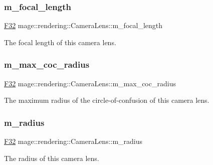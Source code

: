 \subsubsection{\texorpdfstring{m\+\_\+focal\+\_\+length}{m\_focal\_length}}
{\footnotesize\ttfamily \mbox{\hyperlink{namespacemage_aa97e833b45f06d60a0a9c4fc22ae02c0}{F32}} mage\+::rendering\+::\+Camera\+Lens\+::m\+\_\+focal\+\_\+length\hspace{0.3cm}{\ttfamily [private]}}

The focal length of this camera lens. \mbox{\label{classmage_1_1rendering_1_1_camera_lens_a5c7880aabfbe08addb1fcaf9ac5ff940}} 
\subsubsection{\texorpdfstring{m\+\_\+max\+\_\+coc\+\_\+radius}{m\_max\_coc\_radius}}
{\footnotesize\ttfamily \mbox{\hyperlink{namespacemage_aa97e833b45f06d60a0a9c4fc22ae02c0}{F32}} mage\+::rendering\+::\+Camera\+Lens\+::m\+\_\+max\+\_\+coc\+\_\+radius\hspace{0.3cm}{\ttfamily [private]}}

The maximum radius of the circle-\/of-\/confusion of this camera lens. \mbox{\label{classmage_1_1rendering_1_1_camera_lens_ac93ec7ffd20ce31ad9707f700a99dc12}} 
\subsubsection{\texorpdfstring{m\+\_\+radius}{m\_radius}}
{\footnotesize\ttfamily \mbox{\hyperlink{namespacemage_aa97e833b45f06d60a0a9c4fc22ae02c0}{F32}} mage\+::rendering\+::\+Camera\+Lens\+::m\+\_\+radius\hspace{0.3cm}{\ttfamily [private]}}

The radius of this camera lens. 
